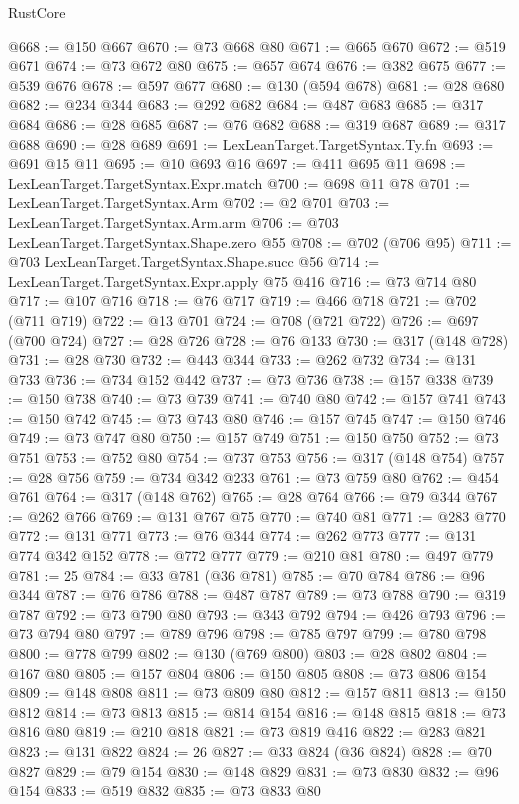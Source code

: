 \begin{lexlean}{RustCore}
\begin{coremodule}
@668 := @150 @667
@670 := @73 @668 @80
@671 := @665 @670
@672 := @519 @671
@674 := @73 @672 @80
@675 := @657 @674
@676 := @382 @675
@677 := @539 @676
@678 := @597 @677
@680 := @130 (@594 @678)
@681 := @28 @680
@682 := @234 @344
@683 := @292 @682
@684 := @487 @683
@685 := @317 @684
@686 := @28 @685
@687 := @76 @682
@688 := @319 @687
@689 := @317 @688
@690 := @28 @689
@691 := LexLeanTarget.TargetSyntax.Ty.fn
@693 := @691 @15 @11
@695 := @10 @693 @16
@697 := @411 @695 @11
@698 := LexLeanTarget.TargetSyntax.Expr.match
@700 := @698 @11 @78
@701 := LexLeanTarget.TargetSyntax.Arm
@702 := @2 @701
@703 := LexLeanTarget.TargetSyntax.Arm.arm
@706 := @703 LexLeanTarget.TargetSyntax.Shape.zero @55
@708 := @702 (@706 @95)
@711 := @703 LexLeanTarget.TargetSyntax.Shape.succ @56
@714 := LexLeanTarget.TargetSyntax.Expr.apply @75 @416
@716 := @73 @714 @80
@717 := @107 @716
@718 := @76 @717
@719 := @466 @718
@721 := @702 (@711 @719)
@722 := @13 @701
@724 := @708 (@721 @722)
@726 := @697 (@700 @724)
@727 := @28 @726
@728 := @76 @133
@730 := @317 (@148 @728)
@731 := @28 @730
@732 := @443 @344
@733 := @262 @732
@734 := @131 @733
@736 := @734 @152 @442
@737 := @73 @736
@738 := @157 @338
@739 := @150 @738
@740 := @73 @739
@741 := @740 @80
@742 := @157 @741
@743 := @150 @742
@745 := @73 @743 @80
@746 := @157 @745
@747 := @150 @746
@749 := @73 @747 @80
@750 := @157 @749
@751 := @150 @750
@752 := @73 @751
@753 := @752 @80
@754 := @737 @753
@756 := @317 (@148 @754)
@757 := @28 @756
@759 := @734 @342 @233
@761 := @73 @759 @80
@762 := @454 @761
@764 := @317 (@148 @762)
@765 := @28 @764
@766 := @79 @344
@767 := @262 @766
@769 := @131 @767 @75
@770 := @740 @81
@771 := @283 @770
@772 := @131 @771
@773 := @76 @344
@774 := @262 @773
@777 := @131 @774 @342 @152
@778 := @772 @777
@779 := @210 @81
@780 := @497 @779
@781 := 25
@784 := @33 @781 (@36 @781)
@785 := @70 @784
@786 := @96 @344
@787 := @76 @786
@788 := @487 @787
@789 := @73 @788
@790 := @319 @787
@792 := @73 @790 @80
@793 := @343 @792
@794 := @426 @793
@796 := @73 @794 @80
@797 := @789 @796
@798 := @785 @797
@799 := @780 @798
@800 := @778 @799
@802 := @130 (@769 @800)
@803 := @28 @802
@804 := @167 @80
@805 := @157 @804
@806 := @150 @805
@808 := @73 @806 @154
@809 := @148 @808
@811 := @73 @809 @80
@812 := @157 @811
@813 := @150 @812
@814 := @73 @813
@815 := @814 @154
@816 := @148 @815
@818 := @73 @816 @80
@819 := @210 @818
@821 := @73 @819 @416
@822 := @283 @821
@823 := @131 @822
@824 := 26
@827 := @33 @824 (@36 @824)
@828 := @70 @827
@829 := @79 @154
@830 := @148 @829
@831 := @73 @830
@832 := @96 @154
@833 := @519 @832
@835 := @73 @833 @80

\end{coremodule}
\end{lexlean}
